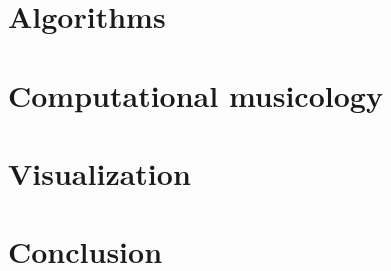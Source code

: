 \section{Algorithms}
\label{sec:algorithms}


\section{Computational musicology}
\label{sec:comp-music}

\section{Visualization}
\label{sec:visualization}

\section{Conclusion}
\label{sec:conclusion}



